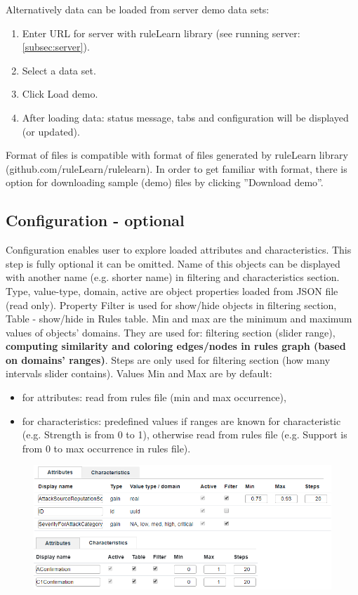 \documentclass[12pt]{article}
\begin{document}
Alternatively data can be loaded from server demo data sets:
\begin{enumerate}
    \setlength\itemsep{0em}
    \item Enter URL for server with ruleLearn library (see running server: \ref{subsec:server}).
    \item Select a data set.
    \item Click Load demo.
    \item After loading data: status message, tabs and configuration will be displayed (or updated).
\end{enumerate}

Format of files is compatible with format of files generated by ruleLearn library \\(github.com/ruleLearn/rulelearn). In order to get familiar with format, there is option for downloading sample (demo) files by clicking ''Download demo''.

\subsection{Configuration - optional}

Configuration enables user to explore loaded attributes and characteristics. This step is fully optional it can be omitted. Name of this objects can be displayed with another name (e.g. shorter name) in filtering and characteristics section. Type, value-type, domain, active are object properties loaded from JSON file (read only). Property Filter is used for show/hide objects in filtering section, Table - show/hide in Rules table. Min and max are the minimum and maximum values of objects' domains. They are used for: filtering section (slider range), \textbf{computing similarity and coloring edges/nodes in rules graph (based on domains' ranges)}. Steps are only used for filtering section (how many intervals slider contains). Values Min and Max are by default:
\begin{itemize}
    \setlength\itemsep{0em}
    \item for attributes: read from rules file (min and max occurrence),
    \item for characteristics: predefined values if ranges are known for characteristic (e.g. Strength is from 0 to 1), otherwise read from rules file (e.g. Support is from 0 to max occurrence in rules file).
\end{itemize}

\begin{figure}[H]
    \centering
    \includegraphics[width=\textwidth]{figures/B-configure.png}
\end{figure}
\end{document}
